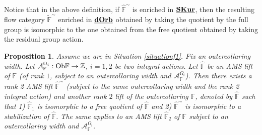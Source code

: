 \documentclass[reqno, 10pt]{amsart}
\numberwithin{equation}{section}
\numberwithin{equation}{section}
\newtheorem{prop}[thm]{Proposition}
\theoremstyle{definition}
\theoremstyle{remark}
\newcommand{\mb}{\mathbb}
\newcommand{\mc}{\mathcal}
\newcommand{\uds}[1]{\underline{\smash{#1}}}
\begin{document}
Notice that in the above definition, if $\hat{\mb F}^\sim$ is enriched in $\uds{\bf SKur}$, then the resulting flow category $\tilde {\mb F}^\sim$ enriched in $\uds{\bf dOrb}$ obtained by taking the quotient by the full group is isomorphic to the one obtained from the free quotient obtained by taking the residual group action.



\begin{prop}\label{prop195}
Assume we are in Situation \ref{situationf1}. Fix an outercollaring width. Let ${\mc A}_{\mb F}^{\Omega_i}: {\rm Ob}{\mb F} \to {\mb Z}$, $i = 1, 2$ be two integral actions. Let $\hat {\mb F}$ be an AMS lift of ${\mb F}$ (of rank $1$, subject to an outercollaring width and ${\mc A}_{\mb F}^{\Omega_i}$). Then there exists a rank 2 AMS lift $\hat {\mb F}^\sim$ (subject to the same outercollaring width and the rank 2 integral action) and another rank $2$ lift of the outercollaring ${\mb F}$, denoted by $\hat {\mb F}$ such that 1) $\hat {\mb F}_1$ is isomorphic to a free quotient of $\hat {\mb F}$ and 2) $\hat {\mb F}^\sim$ is isomorphic to a stabilization of $\hat {\mb F}$. The same applies to an AMS lift $\hat{\mb F}_2$ of ${\mb F}$ subject to an outercollaring width and ${\mc A}_{\mb F}^{\Omega_i}$.
\end{prop}
\end{document}
